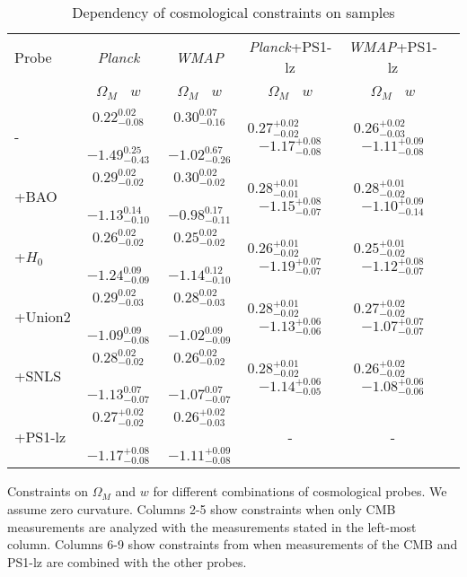 \documentclass[12pt,preprint]{aastex}
\begin{document}
\begin{table}[ht]
\caption{Dependency of cosmological constraints on samples}
\begin{tabular}{l|c|c|c|c|c}
\hline \hline
Probe & \textit{Planck} & \textit{WMAP} &\textit{Planck}+PS1-lz &\textit{WMAP}+PS1-lz   \\
~ & $\Omega_M~~~~w$  & $\Omega_M~~~~w$  & $\Omega_M~~~~w$&  $\Omega_M~~~~w$} \\
\hline
- & $0.22^{0.02}_{-0.08}$ ~~~~ $-1.49^{0.25}_{-0.43}$ & $0.30^{0.07}_{-0.16}$ ~~~~ $-1.02^{0.67}_{-0.26}$ &  $ 0.27^{+0.02}_{-0.02}$  ~~~~  $-1.17^{+0.08}_{-0.08}$  &  $ 0.26^{+0.02}_{-0.03}$  ~~~  $-1.11^{+0.09}_{-0.08}$ \\
+BAO & $0.29^{0.02}_{-0.02}$ ~~~~ $-1.13^{0.14}_{-0.10}$ & $0.30^{0.02}_{-0.02}$ ~~~~ $-0.98^{0.17}_{-0.11}$ &  $ 0.28^{+0.01}_{-0.01}$  ~~~~  $-1.15^{+0.08}_{-0.07}$ &  $ 0.28^{+0.01}_{-0.02}$  ~~~  $-1.10^{+0.09}_{-0.14}$ \\
+$H_0$ & $0.26^{0.02}_{-0.02}$ ~~~~ $-1.24^{0.09}_{-0.09}$ & $0.25^{0.02}_{-0.02}$ ~~~~ $-1.14^{0.12}_{-0.10}$ &  $ 0.26^{+0.01}_{-0.02}$  ~~~~  $-1.19^{+0.07}_{-0.07}$ &  $ 0.25^{+0.01}_{-0.02}$  ~~~  $-1.12^{+0.08}_{-0.07}$ \\
+Union2 & $0.29^{0.02}_{-0.03}$ ~~~~ $-1.09^{0.09}_{-0.08}$ & $0.28^{0.02}_{-0.03}$ ~~~~ $-1.02^{0.09}_{-0.09}$ &  $ 0.28^{+0.01}_{-0.02}$  ~~~~  $-1.13^{+0.06}_{-0.06}$ &  $ 0.27^{+0.02}_{-0.02}$  ~~~  $-1.07^{+0.07}_{-0.07}$ \\
+SNLS & $0.28^{0.02}_{-0.02}$ ~~~~ $-1.13^{0.07}_{-0.07}$ & $0.26^{0.02}_{-0.02}$ ~~~~ $-1.07^{0.07}_{-0.07}$ &  $ 0.28^{+0.01}_{-0.02}$  ~~~~  $-1.14^{+0.06}_{-0.05}$  &  $ 0.26^{+0.02}_{-0.02}$  ~~~  $-1.08^{+0.06}_{-0.06}$ \\
+PS1-lz & $ 0.27^{+0.02}_{-0.02}$  ~~~~  $-1.17^{+0.08}_{-0.08}$  &  $ 0.26^{+0.02}_{-0.03}$  ~~~  $-1.11^{+0.09}_{-0.08}$ & - & -\\
\hline
\end{tabular}
Constraints on $\Omega_M$ and $w$ for different combinations of cosmological probes.  We assume zero curvature.  Columns 2-5 show constraints when only CMB measurements are analyzed with the measurements stated in the left-most column.  Columns 6-9 show constraints from when measurements of the CMB and PS1-lz are combined with the other probes.
\end{table}
\end{document}
